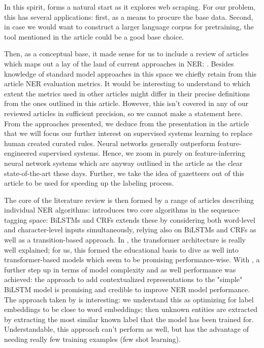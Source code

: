 \documentclass[11pt]{article}
\begin{document}
In this spirit, \citet{barbaresi-2021-trafilatura} forms a natural start as it explores web scraping. For our problem, this has several applications: first, as a means to procure the base data. Second, in case we would want to construct a larger language corpus for pretraining, the tool mentioned in the article could be a good base choice. 

Then, as a conceptual base, it made sense for us to include a review of articles which maps out a lay of the land of current approaches in NER: \citet{yadav-bethard-2018-survey}. Besides knowledge of standard model approaches in this space we chiefly retain from this article NER evaluation metrics. It would be interesting to understand to which extent the metrics used in other articles might differ in their precise definitions from the ones outlined in this article. However, this isn't covered in any of our reviewed articles in sufficient precision, so we cannot make a statement here. From the approaches presented, we deduce from the presentation in the article that we will focus our further interest on supervised systems learning to replace human created curated rules. Neural networks generally outperform feature-engineered supervised systems. Hence, we zoom in purely on feature-inferring neural network systems which are anyway outlined in the article as the clear state-of-the-art these days. Further, we take the idea of gazetteers out of this article to be used for speeding up the labeling process. 

The core of the literature review is then formed by a range of articles describing individual NER algorithms: \citet{DBLP:journals/corr/HuangXY15} introduces two core algorithms in the sequence-tagging space: BiLSTMs and CRFs  \citet{lample-etal-2016-neural} extends these by considering both word-level and character-level inputs simultaneously, relying also on BiLSTMs and CRFs as well as a transition-based approach. In \citet{rush-2018-annotated}, the transformer architecture is really well explained; for us, this formed the educational basis to dive as well into transformer-based models which seem to be promising performance-wise. With \citet{DBLP:journals/corr/abs-1911-02257}, a further step up in terms of model complexity and as well performance was achieved: the approach to add contextualized representations to the "simple" BiLSTM model is promising and credible to improve NER model performance. The approach taken by \citet{yang-katiyar-2020-simple} is interesting: we understand this as optimizing for label embeddings to be close to word embeddings; then unknown entities are extracted by extracting the most similar known label that the model has been trained for. Understandable, this approach can't perform as well, but has the advantage of needing really few training examples (few shot learning). 
\end{document}

